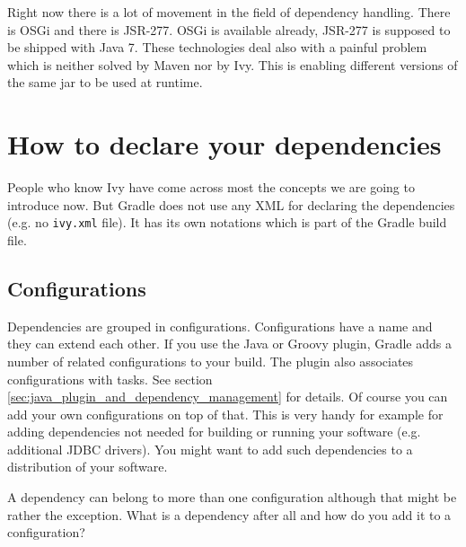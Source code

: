 Right now there is a lot of movement in the field of dependency handling. There is OSGi and there is JSR-277. OSGi is available already, JSR-277 is supposed to be shipped with Java 7. These technologies deal also with a painful problem which is neither solved by Maven nor by Ivy. This is enabling different versions of the same jar to be used at runtime.

\section{How to declare your dependencies} %
\label{sec:how_to_declare_your_dependencies}
People who know Ivy have come across most the concepts we are going to introduce now. But Gradle does not use any XML for declaring the dependencies (e.g. no \texttt{ivy.xml} file). It has its own notations which is part of the Gradle build file.

\subsection{Configurations} %
\label{sub:configurations}
Dependencies are grouped in configurations. Configurations have a name and they can extend each other. If you use the Java or Groovy plugin, Gradle adds a number of related configurations to your build. The plugin also associates configurations with tasks. See section \ref{sec:java_plugin_and_dependency_management} for details. Of course you can add your own configurations on top of that. This is very handy for example for adding dependencies not needed for building or running your software (e.g. additional JDBC drivers). You might want to add such dependencies to a distribution of your software.

A dependency can belong to more than one configuration although that might be rather the exception. What is a dependency after all and how do you add it to a configuration?


